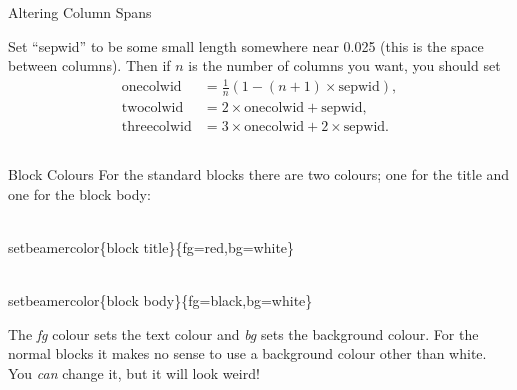 \documentclass[final]{beamer}
\newlength{\sepwid}
\newlength{\onecolwid}
\newlength{\twocolwid}
\newlength{\threecolwid}
\begin{document}
\begin{frame}[t]
\begin{columns}[t]
\begin{column}{\twocolwid}
\begin{block}{Altering Column Spans}

        Set ``sepwid'' to be some small length somewhere near 0.025 (this is the space between columns). Then if $n$ is the number of columns you want, you should set
        \begin{align*}
          \text{onecolwid} & = \frac{1}{n}(1-(n+1)\times\text{sepwid}), \\
          \text{twocolwid} & = 2\times\text{onecolwid} + \text{sepwid}, \\
          \text{threecolwid} & = 3\times\text{onecolwid} + 2\times\text{sepwid}.
        \end{align*}
      \end{block}
      \begin{columns}[t,totalwidth=\threecolwid]	%
        \begin{column}{\onecolwid}
          \begin{block}{Block Colours}
            For the standard blocks there are two colours; one for the title and one for the block body:\\
            \begin{semiverbatim}
              {\color{red}\\setbeamercolor}\{block title\}\newline \{fg=red,bg=white\}
            \end{semiverbatim}
            \begin{semiverbatim}
              {\color{red}\\setbeamercolor}\{block  body\}\newline \{fg=black,bg=white\}
            \end{semiverbatim}
            The \emph{fg} colour sets the text colour and \emph{bg} sets the background colour.
            For the normal blocks it makes no sense to use a background colour other than white. You \emph{can} change it, but it will look weird!

\end{block}
\end{column}
\end{columns}
\end{column}
\end{columns}
\end{frame}
\end{document}
